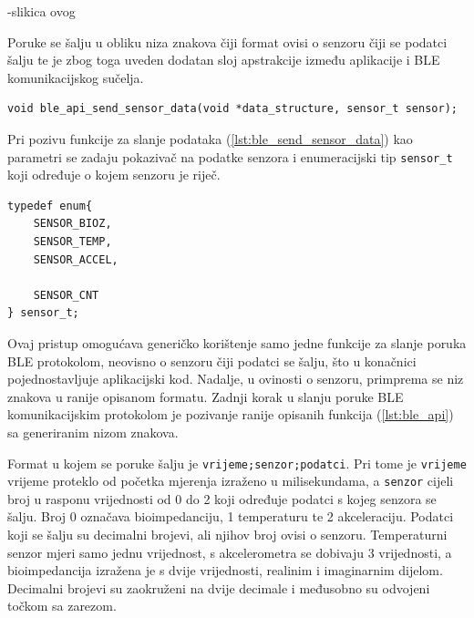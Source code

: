 \documentclass[../diplomski_rad.tex]{subfiles}
\begin{document}
-slikica ovog

Poruke se šalju u obliku niza znakova čiji format ovisi o senzoru čiji se podatci šalju te je zbog toga uveden dodatan sloj 
apstrakcije između aplikacije i BLE komunikacijskog sučelja.
\begin{lstlisting}[label={lst:ble_send_sensor_data},style=CStyle,caption={Funkcija za slanje rezultata mjerenja sa pojedinog senzora},captionpos=b]
void ble_api_send_sensor_data(void *data_structure, sensor_t sensor);
\end{lstlisting} 
Pri pozivu funkcije za slanje podataka (\ref{lst:ble_send_sensor_data}) kao parametri se zadaju 
pokazivač na podatke senzora i enumeracijski tip \texttt{sensor\_t} koji određuje o kojem senzoru je riječ. 

\begin{lstlisting}[label={lst:sensor_type},style=CStyle,caption={Enumeriacijski tip podataka za odabir senzora},captionpos=b]
typedef enum{
    SENSOR_BIOZ,
    SENSOR_TEMP,
    SENSOR_ACCEL,

    SENSOR_CNT
} sensor_t;
\end{lstlisting} 

Ovaj pristup omogućava generičko korištenje samo jedne funkcije za slanje poruka BLE protokolom, 
neovisno o senzoru čiji podatci se šalju, što u konačnici pojednostavljuje aplikacijski kod. 
Nadalje, u ovinosti o senzoru, primprema se niz znakova u ranije opisanom formatu. 
Zadnji korak u slanju poruke BLE komunikacijskim protokolom je pozivanje ranije opisanih funkcija (\ref{lst:ble_api}) sa 
generiranim nizom znakova.  

Format u kojem se poruke šalju je \texttt{vrijeme;senzor;podatci}. Pri tome je \texttt{vrijeme} vrijeme proteklo 
od početka mjerenja izraženo u milisekundama, a \texttt{senzor} cijeli broj u rasponu vrijednosti od 0 do 2 koji 
određuje podatci s kojeg senzora se šalju. Broj 0 označava bioimpedanciju, 1 temperaturu te 2 akceleraciju.  
Podatci koji se šalju su decimalni brojevi, ali njihov broj ovisi o senzoru. Temperaturni senzor mjeri samo jednu vrijednost, 
s akcelerometra se dobivaju 3 vrijednosti, a bioimpedancija izražena je s dvije vrijednosti, realinim i imaginarnim dijelom. 
Decimalni brojevi su zaokruženi na dvije decimale i međusobno su odvojeni točkom sa zarezom. 
\end{document}

